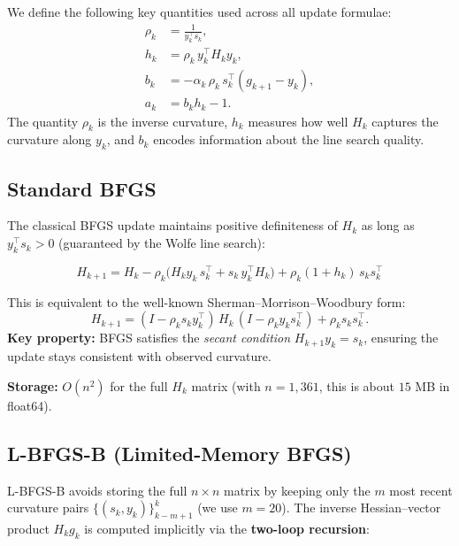 \documentclass[11pt,a4paper]{article}
\newcommand{\Hk}{H_k}
\newcommand{\Hkp}{H_{k+1}}
\newcommand{\sk}{s_k}
\newcommand{\yk}{y_k}
\newcommand{\gk}{g_k}
\begin{document}
We define the following key quantities used across all update formulae:
\begin{align}
  \rho_k &= \frac{1}{\yk^\top \sk}, \label{eq:rhok}\\
  h_k &= \rho_k \,\yk^\top \Hk \yk, \label{eq:hk}\\
  b_k &= -\alpha_k \,\rho_k \,\sk^\top\!(g_{k+1} - \yk), \label{eq:bk}\\
  a_k &= b_k h_k - 1. \label{eq:ak}
\end{align}
The quantity $\rho_k$ is the inverse curvature, $h_k$ measures how well
$\Hk$ captures the curvature along $\yk$, and $b_k$ encodes information
about the line search quality.

\subsection{Standard BFGS}
\label{sec:bfgs}

The classical BFGS update maintains positive definiteness of $\Hk$ as long
as $\yk^\top \sk > 0$ (guaranteed by the Wolfe line search):

\begin{equation}
\boxed{
  \Hkp = \Hk
    - \rho_k\!\big(\Hk \yk \,\sk^\top + \sk\, \yk^\top \Hk\big)
    + \rho_k(1 + h_k)\,\sk \sk^\top
}
\label{eq:bfgs}
\end{equation}

This is equivalent to the well-known Sherman--Morrison--Woodbury form:
\begin{equation}
  \Hkp = (I - \rho_k \sk \yk^\top)\,\Hk\,(I - \rho_k \yk \sk^\top)
          + \rho_k \sk \sk^\top.
  \label{eq:bfgs_smw}
\end{equation}
\textbf{Key property:} BFGS satisfies the \emph{secant condition}
$\Hkp \yk = \sk$, ensuring the update stays consistent with observed
curvature.

\textbf{Storage:} $O(n^2)$ for the full $\Hk$ matrix (with
$n = 1{,}361$, this is about $15$ MB in float64).

\subsection{L-BFGS-B (Limited-Memory BFGS)}
\label{sec:lbfgs}

L-BFGS-B avoids storing the full $n \times n$ matrix by keeping only
the $m$ most recent curvature pairs $\{(\sk, \yk)\}_{k-m+1}^{k}$
(we use $m = 20$).  The inverse Hessian--vector product $\Hk \gk$ is
computed implicitly via the \textbf{two-loop recursion}:
\end{document}
